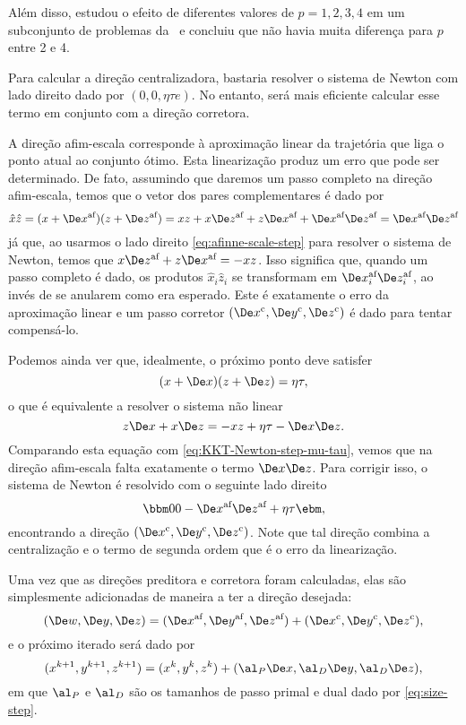 Além disso, \textcite{Mehrotra:1992wr} estudou o efeito de diferentes valores de
$p= 1,2,3,4$ em um subconjunto  de problemas da \Netlib\ e concluiu que não havia
 muita diferença para $p$ entre 2 e 4.

Para calcular a direção centralizadora, bastaria resolver o sistema de Newton
com lado direito dado por $(0,0,\eta \tau e)$. No entanto, será mais eficiente
calcular esse termo em conjunto com a direção corretora. 

A direção afim-escala corresponde à aproximação linear da trajetória que liga o
ponto atual ao conjunto ótimo.  Esta linearização produz um erro que pode ser
determinado. De fato, assumindo que daremos um passo completo na direção
afim-escala, temos que o vetor dos pares complementares é  dado por 
\[
\hat{x}\hat{z} = (x+\dex)(z + \dez) = xz + x\dez + z\dex + \dex
\dez =  \dex\dez \] 
já que, ao usarmos o lado direito
\eqref{eq:afinne-scale-step} para resolver o sistema de Newton, temos que
$x\dez  + z\dex  = -xz$. Isso significa que, quando um passo completo é
dado, os produtos $\hat{x}_i\hat{z}_i$ se transformam em $\dex_i\dez_i $, ao
invés de se anularem como era esperado. Este é exatamente o erro da aproximação linear e
um passo corretor $(\Decox, \Decoy, \Decoz)$ é dado para tentar compensá-lo.

Podemos ainda ver que, idealmente, o próximo ponto deve
satisfer  \[ (x+\Dex)(z+\Dez) =\eta\tau , \] o que é equivalente a resolver
o sistema não linear \[ z\Dex + x\Dez = -xz + \eta\tau 
 - \Dex\Dez . \] Comparando esta equação com
 \eqref{eq:KKT-Newton-step-mu-tau}, vemos que na direção afim-escala falta
 exatamente o termo $\Dex\Dez$. Para corrigir isso, o sistema de Newton é
 resolvido com o seguinte lado direito
  \begin{equation}
 \label{eq:corrector-centralizer-step}
 \bbm 0\\ 0 \\ - \dex \dez  + \eta\tau  \ebm, 
 \end{equation}
 encontrando a direção $(\Decox, \Decoy, \Decoz)$. Note que tal direção
 combina a centralização e o termo de segunda ordem   que é o 
 erro da linearização.
 
 Uma vez que as direções preditora e corretora foram calculadas, elas são
 simplesmente adicionadas de maneira a ter a direção desejada:
\begin{equation}
\label{eq:Mehrotra-direction}
 (\Dew, \Dey, \Dez) =  (\dex, \dey, \dez) +  (\Decox, \Decoy,
 \Decoz),
\end{equation}
 e o próximo iterado será dado por
\begin{equation}
\label{eq:Mehrotra-updating}
 (x^{k+1}, y^{k+1},  z^{k+1}) =  (x^{k}, y^{k},  z^{k}) + (\al_P\Dex,\al_D \De
 y, \al_D\Dez),
\end{equation}
 em que $\al_P$ e $\al_D$ são os tamanhos de passo primal e dual dado por
 \eqref{eq:size-step}. 
 
